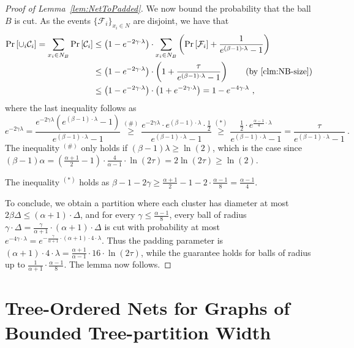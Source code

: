\documentclass{theoretics}
\def\cF{\ensuremath{\mathcal{F}}}
\begin{document}
\begin{proof}[Proof of Lemma~\ref{lem:NetToPadded}]
	We now bound the probability that the ball $B$ is cut. As the events $\{\cF_i\}_{x_i\in N}$ are disjoint, we have that
	\begin{align*}
		\Pr\left[\cup_{i}\mathcal{C}_{i}\right]=\sum_{x_{i}\in N_{B}}\Pr\left[\mathcal{C}_{i}\right] & \le\left(1-e^{-2\gamma\cdot\lambda}\right)\cdot\sum_{x_{i}\in N_{B}}\left(\Pr\left[\mathcal{F}_{i}\right]+\frac{1}{e^{(\beta-1)\cdot\lambda}-1}\right)\\
		& \le\left(1-e^{-2\gamma\cdot\lambda}\right)\cdot\left(1+\frac{\tau}{e^{(\beta-1)\cdot\lambda}-1}\right)\qquad\mbox{(by \Cref{clm:NB-size})}\\
		& \le\left(1-e^{-2\gamma\cdot\lambda}\right)\cdot\left(1+e^{-2\gamma\cdot\lambda}\right)=1-e^{-4\gamma\cdot\lambda}~,
	\end{align*}
	where the last inequality follows as
	\[
	e^{-2\gamma\lambda}=\frac{e^{-2\gamma\lambda}\left(e^{(\beta-1)\cdot\lambda}-1\right)}{e^{(\beta-1)\cdot\lambda}-1}\overset{(\#)}\ge\frac{e^{-2\gamma\lambda}\cdot e^{(\beta-1)\cdot\lambda}\cdot\frac{1}{2}}{e^{(\beta-1)\cdot\lambda}-1}\overset{(*)}{\ge}\frac{\frac{1}{2}\cdot e^{\frac{\alpha-1}{4}\cdot\lambda}}{e^{(\beta-1)\cdot\lambda}-1}=\frac{\tau}{e^{(\beta-1)\cdot\lambda}-1}~.
	\]
    The inequality $^{(\#)}$ only holds if $(\beta - 1)\lambda \geq \ln(2)$, which is the case since $(\beta - 1)\alpha = \left( \frac{\alpha + 1}{2} - 1 \right) \cdot \frac{4}{\alpha - 1} \cdot \ln(2\tau) = 2 \ln(2\tau) \geq \ln(2)$.
    
	The inequality $^{(*)}$ holds as $\beta-1-2\gamma\ge\frac{\alpha+1}{2}-1-2\cdot\frac{\alpha-1}{8}=\frac{\alpha-1}{4}$.
	
	
	
	To conclude, we obtain a partition where each cluster has diameter at most $2\beta\Delta\le(\alpha+1)\cdot\Delta$, and for every $\gamma\le\frac{\alpha-1}{8}$, every ball of radius
	$\gamma\cdot\Delta=\frac{\gamma}{\alpha+1}\cdot(\alpha+1)\cdot\Delta$
	is cut with probability at most $e^{-4\gamma\cdot\lambda}=e^{-\frac{\gamma}{\alpha+1}\cdot(\alpha+1)\cdot4\cdot\lambda}$.
	Thus the padding parameter is $(\alpha+1)\cdot4\cdot\lambda=\frac{\alpha+1}{\alpha-1}\cdot16\cdot\ln(2\tau)$,
	while the guarantee holds for balls of radius up to $\frac{1}{\alpha+1}\cdot\frac{\alpha-1}{8}$.
	The lemma now follows.
\end{proof}




\section{Tree-Ordered Nets for Graphs of Bounded Tree-partition Width}\label{sec:treenet-tp}
\end{document}
